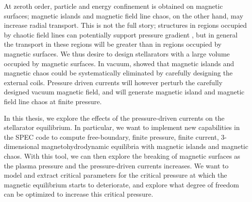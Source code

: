\documentclass[my_thesis.tex]{subfiles}
\begin{document}
At zeroth order, particle and energy confinement is obtained on magnetic surfaces; magnetic islands and magnetic field line chaos, on the other hand, may increase radial transport. This is not the full story; structures in regions occupied by chaotic field lines can potentially support pressure gradient \citep{Hudson2008}, but in general the transport in these regions will be greater than in regions occupied by magnetic surfaces. We thus desire to design stellarators with a large volume occupied by magnetic surfaces. In vacuum, \citet{Hanson1984a,Cary1986} showed that magnetic islands and magnetic chaos could be systematically eliminated by carefully designing the external coils. Pressure driven currents will  however perturb the carefully designed vacuum magnetic field, and will generate magnetic island and magnetic field line chaos at finite pressure.

In this thesis, we explore the effects of the pressure-driven currents on the stellarator equilibrium. In particular, we want to implement new capabilities in the \ac{SPEC} code to compute free-boundary, finite pressure, finite current, 3-dimensional magnetohydrodynamic equilibria with magnetic islands and magnetic chaos. With this tool, we can then explore the breaking of magnetic surfaces as the plasma pressure and the pressure-driven currents increases. We want to model and extract critical parameters for the critical pressure at which the magnetic equilibrium starts to deteriorate, and explore what degree of freedom can be optimized to increase this critical pressure.


\end{document}
